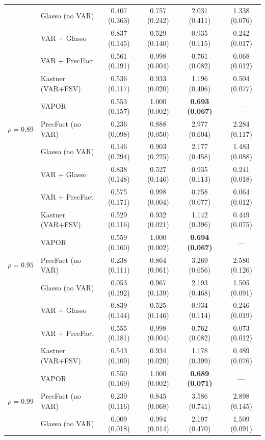 \begin{table}[h!]
\begin{tabular}{llcccc}
              & Glasso (no VAR)    & 0.407 (0.363) & 0.757 (0.242) & 2.031 (0.411) & 1.338 (0.076) \\
              & VAR + Glasso       & 0.837 (0.145) & 0.529 (0.140) & 0.935 (0.115) & 0.242 (0.017) \\
              & VAR + PrecFact     & 0.561 (0.191) & 0.998 (0.004) & 0.761 (0.082) & 0.068 (0.012) \\
              & Kastner (VAR+FSV)  & 0.536 (0.117) & 0.933 (0.020) & 1.196 (0.406) & 0.504 (0.077) \\
              & VAPOR              & 0.553 (0.157) & 1.000 (0.002) & \textbf{0.693 (0.067)} & --- \\
\midrule
$\rho = 0.89$ & PrecFact (no VAR)  & 0.236 (0.098) & 0.888 (0.050) & 2.977 (0.604) & 2.284 (0.117) \\
              & Glasso (no VAR)    & 0.146 (0.294) & 0.903 (0.225) & 2.177 (0.458) & 1.483 (0.088) \\
              & VAR + Glasso       & 0.838 (0.148) & 0.527 (0.146) & 0.935 (0.113) & 0.241 (0.018) \\
              & VAR + PrecFact     & 0.575 (0.171) & 0.998 (0.004) & 0.758 (0.077) & 0.064 (0.012) \\
              & Kastner (VAR+FSV)  & 0.529 (0.116) & 0.932 (0.021) & 1.142 (0.396) & 0.449 (0.075) \\
              & VAPOR              & 0.559 (0.160) & 1.000 (0.002) & \textbf{0.694 (0.067)} & --- \\
\midrule
$\rho = 0.95$ & PrecFact (no VAR)  & 0.238 (0.111) & 0.864 (0.061) & 3.269 (0.656) & 2.580 (0.126) \\
              & Glasso (no VAR)    & 0.053 (0.192) & 0.967 (0.139) & 2.193 (0.468) & 1.505 (0.091) \\
              & VAR + Glasso       & 0.839 (0.144) & 0.525 (0.146) & 0.934 (0.114) & 0.246 (0.019) \\
              & VAR + PrecFact     & 0.555 (0.181) & 0.998 (0.004) & 0.762 (0.082) & 0.073 (0.012) \\
              & Kastner (VAR+FSV)  & 0.543 (0.109) & 0.934 (0.020) & 1.178 (0.399) & 0.489 (0.076) \\
              & VAPOR              & 0.550 (0.169) & 1.000 (0.002) & \textbf{0.689 (0.071)} & --- \\
\midrule
$\rho = 0.99$ & PrecFact (no VAR)  & 0.239 (0.116) & 0.845 (0.068) & 3.586 (0.741) & 2.898 (0.145) \\
              & Glasso (no VAR)    & 0.009 (0.018) & 0.994 (0.014) & 2.197 (0.470) & 1.509 (0.091) \\

\end{tabular}
\end{table}
